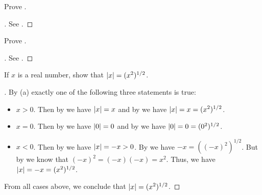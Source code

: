 \exercisesection

\begin{ex}\label{i:ex:5.6.1}
  Prove .
\end{ex}

\begin{proof}[]
  See .
\end{proof}

\begin{ex}\label{i:ex:5.6.2}
  Prove .
\end{ex}

\begin{proof}[]
  See .
\end{proof}

\begin{ex}\label{i:ex:5.6.3}
  If \(x\) is a real number, show that \(\left\lvert x\right\rvert = (x^2)^{1 / 2}\).
\end{ex}

\begin{proof}[]
  By (a) exactly one of the following three statements is true:
  \begin{itemize}
    \item \(x > 0\).
          Then by  we have \(\left\lvert x\right\rvert = x\) and by  we have \(\left\lvert x\right\rvert = x = (x^2)^{1 / 2}\).
    \item \(x = 0\).
          Then by  we have \(\left\lvert0\right\rvert = 0\) and by  we have \(\left\lvert0\right\rvert = 0 = (0^2)^{1 / 2}\).
    \item \(x < 0\).
          Then by  we have \(\left\lvert x\right\rvert = -x > 0\).
          By  we have \(-x = ((-x)^2)^{1 / 2}\).
          But by  we know that \((-x)^2 = (-x)(-x) = x^2\).
          Thus, we have \(\left\lvert x\right\rvert = -x = (x^2)^{1 / 2}\).
  \end{itemize}
  From all cases above, we conclude that \(\left\lvert x\right\rvert = (x^2)^{1 / 2}\).
\end{proof}
